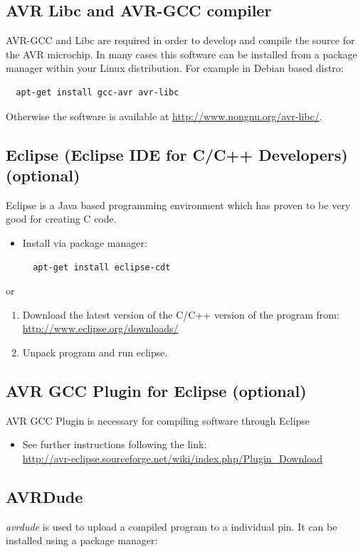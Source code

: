 \documentclass[a4paper, twoside, final]{book}%
\begin{document}
\subsection*{\bf AVR Libc and AVR-GCC compiler}
AVR-GCC and Libc are required in order to develop and compile the source for the AVR microchip. 
In many cases this software can be installed from a package manager within your Linux distribution. For example in Debian based distro:

\begin{lstlisting}
  apt-get install gcc-avr avr-libc
\end{lstlisting}

Otherwise the software is available at \url{http://www.nongnu.org/avr-libc/}.

\subsection*{\bf Eclipse (Eclipse IDE for C/C++ Developers) (optional)}
Eclipse is a Java based programming environment which has proven to be very good for creating C code.
\begin{itemize}
  \item Install via package manager:
\begin{lstlisting}
  apt-get install eclipse-cdt
\end{lstlisting}
\end{itemize}
or
\begin{enumerate}
	\item Download the latest version of the C/C++ version of the program from: \\
	\url{http://www.eclipse.org/downloads/}
	\item Unpack program and run eclipse.
\end{enumerate}

\subsection*{\bf AVR GCC Plugin for Eclipse (optional)}
AVR GCC Plugin is necessary for compiling software through Eclipse
\begin{itemize}
	\item See further instructions following the link: \\
	\url{http://avr-eclipse.sourceforge.net/wiki/index.php/Plugin_Download}
\end{itemize}


\subsection*{\bf AVRDude}
\emph{avrdude} is used to upload a compiled program to a individual pin. It can be installed using a package manager:
\end{document}
